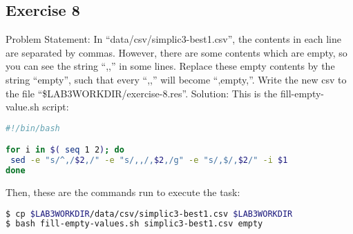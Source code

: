 \documentclass{article}
\begin{document}
\subsection{Exercise 8}
\large{Problem Statement: }\normalsize In ``data/csv/simplic3-best1.csv'', the contents in each line are separated by commas. However,
there are some contents which are empty, so you can see the string ``,,'' in some lines.
Replace these empty contents by the string ``empty'', such that every ``,,'' will become ``,empty,''.
Write the new csv to the file ``\$LAB3WORKDIR/exercise-8.res''.
\newline\newline
\large{Solution: }\normalsize This is the fill-empty-value.sh script:
\begin{lstlisting}[language=bash]
#!/bin/bash

for i in $( seq 1 2); do
 sed -e "s/^,/$2,/" -e "s/,,/,$2,/g" -e "s/,$/,$2/" -i $1
done
\end{lstlisting}
Then, these are the commands run to execute the task:
\begin{lstlisting}[language=bash]
$ cp $LAB3WORKDIR/data/csv/simplic3-best1.csv $LAB3WORKDIR 
$ bash fill-empty-values.sh simplic3-best1.csv empty
\end{lstlisting}

\newpage
\end{document}
